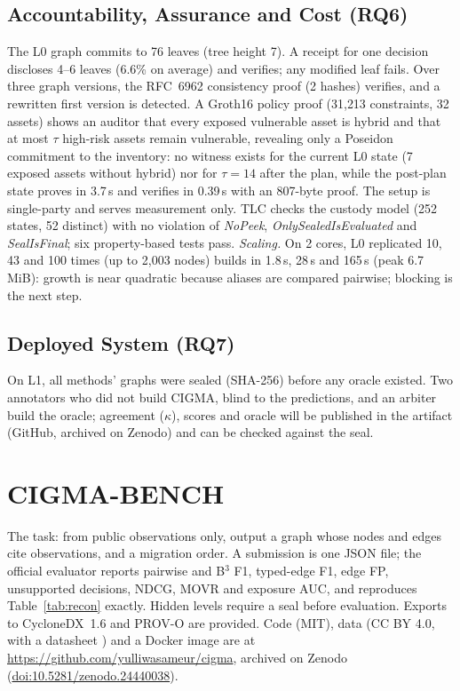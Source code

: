 \documentclass[a4paper,twoside]{article}
\begin{document}
\subsection{Accountability, Assurance and Cost (RQ6)}
The L0 graph commits to 76 leaves (tree height 7). A receipt for one decision discloses 4--6 leaves (6.6\% on average) and verifies; any modified leaf fails. Over three graph versions, the RFC~6962 consistency proof (2 hashes) verifies, and a rewritten first version is detected. A Groth16 policy proof (31{,}213 constraints, 32 assets) shows an auditor that every exposed vulnerable asset is hybrid and that at most $\tau$ high-risk assets remain vulnerable, revealing only a Poseidon commitment to the inventory: no witness exists for the current L0 state (7 exposed assets without hybrid) nor for $\tau{=}14$ after the plan, while the post-plan state proves in 3.7\,s and verifies in 0.39\,s with an 807-byte proof. The setup is single-party and serves measurement only. TLC checks the custody model (252 states, 52 distinct) with no violation of \emph{NoPeek}, \emph{OnlySealedIsEvaluated} and \emph{SealIsFinal}; six property-based tests pass. \emph{Scaling.} On 2 cores, L0 replicated 10, 43 and 100 times (up to 2{,}003 nodes) builds in 1.8\,s, 28\,s and 165\,s (peak 6.7\,MiB): growth is near quadratic because aliases are compared pairwise; blocking is the next step.

\subsection{Deployed System (RQ7)}
On L1, all methods' graphs were sealed (SHA-256) before any oracle existed. Two annotators who did not build CIGMA, blind to the predictions, and an arbiter build the oracle; agreement ($\kappa$), scores and oracle will be published in the artifact (GitHub, archived on Zenodo) and can be checked against the seal.

\section{\uppercase{CIGMA-Bench}}
\label{sec:bench}
The task: from public observations only, output a graph whose nodes and edges cite observations, and a migration order. A submission is one JSON file; the official evaluator reports pairwise and B$^3$ F1, typed-edge F1, edge FP, unsupported decisions, NDCG, MOVR and exposure AUC, and reproduces Table~\ref{tab:recon} exactly. Hidden levels require a seal before evaluation. Exports to CycloneDX~1.6 \cite{cyclonedx2024cbom} and PROV-O \cite{w3c2013provo} are provided. Code (MIT), data (CC BY 4.0, with a datasheet \cite{gebru2021datasheets}) and a Docker image are at \url{https://github.com/yulliwasameur/cigma}, archived on Zenodo (\href{https://doi.org/10.5281/zenodo.24440038}{doi:10.5281/zenodo.24440038}).
\end{document}
